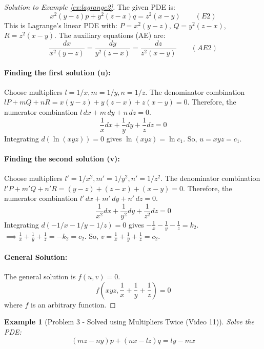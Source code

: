 \documentclass{article}
\newtheorem{example}{Example}[section]    %
\theoremstyle{remark}
\begin{document}
	\begin{proof}[Solution to Example \ref{ex:lagrange2}]
		The given PDE is:
		\[ x^2(y-z)p + y^2(z-x)q = z^2(x-y) \quad \quad (E2) \]
		This is Lagrange's linear PDE with: $P = x^2(y-z)$, $Q = y^2(z-x)$, $R = z^2(x-y)$.
		The auxiliary equations (AE) are:
		\[
		\frac{dx}{x^2(y-z)} = \frac{dy}{y^2(z-x)} = \frac{dz}{z^2(x-y)} \quad \quad (AE2)
		\]
		\paragraph{Finding the first solution (u):}
		Choose multipliers $l=1/x, m=1/y, n=1/z$.
		The denominator combination $lP + mQ + nR = x(y-z) + y(z-x) + z(x-y) = 0$.
		Therefore, the numerator combination $l\,dx + m\,dy + n\,dz = 0$.
		\[ \frac{1}{x}dx + \frac{1}{y}dy + \frac{1}{z}dz = 0 \]
		Integrating $d(\ln(xyz)) = 0$ gives $\ln(xyz) = \ln c_1$.
		So, $u = xyz = c_1$.
		
		\paragraph{Finding the second solution (v):}
		Choose multipliers $l'=1/x^2, m'=1/y^2, n'=1/z^2$.
		The denominator combination $l'P + m'Q + n'R = (y-z) + (z-x) + (x-y) = 0$.
		Therefore, the numerator combination $l'\,dx + m'\,dy + n'\,dz = 0$.
		\[ \frac{1}{x^2}dx + \frac{1}{y^2}dy + \frac{1}{z^2}dz = 0 \]
		Integrating $d(-1/x - 1/y - 1/z) = 0$ gives $-\frac{1}{x} - \frac{1}{y} - \frac{1}{z} = k_2$.
		$\implies \frac{1}{x} + \frac{1}{y} + \frac{1}{z} = -k_2 = c_2$.
		So, $v = \frac{1}{x} + \frac{1}{y} + \frac{1}{z} = c_2$.
		
		\paragraph{General Solution:} The general solution is $f(u, v) = 0$.
		\[
		f \left( xyz, \frac{1}{x} + \frac{1}{y} + \frac{1}{z} \right) = 0
		\]
		where $f$ is an arbitrary function.
	\end{proof}
	
	\begin{example}[Problem 3 - Solved using Multipliers Twice (Video 11)]
		\label{ex:lagrange3}
		Solve the PDE:
		\[ (mz-ny)p + (nx-lz)q = ly-mx \]
	\end{example}
	
\end{document}
